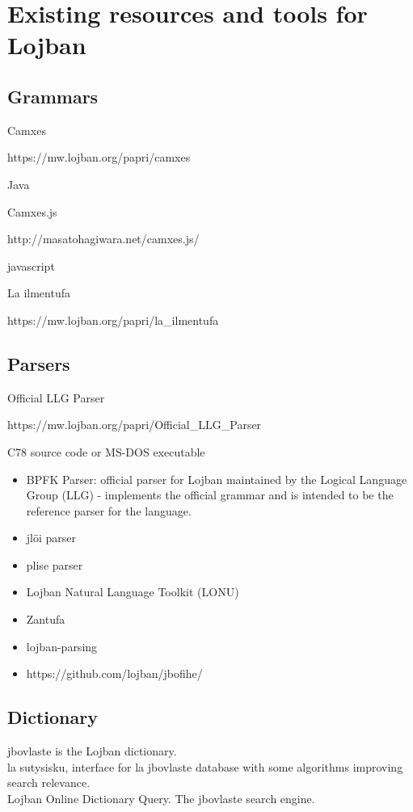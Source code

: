 \chapter{Existing resources and tools for Lojban}
\label{chap:existing-resources-and-tools}

\vspace{0.5cm}

\section*{Grammars}
\label{section:lojban-grammars}

Camxes

https://mw.lojban.org/papri/camxes

Java

Camxes.js

http://masatohagiwara.net/camxes.js/

javascript

La ilmentufa

https://mw.lojban.org/papri/la\_ilmentufa


\section*{Parsers}

Official LLG Parser

https://mw.lojban.org/papri/Official\_LLG\_Parser

C78 source code
or
MS-DOS executable

\begin{itemize}
    \item BPFK Parser: official parser for Lojban maintained by the Logical Language Group (LLG) - implements the official grammar and is intended to be the reference parser for the language.
    \item jlöi parser
    \item plise parser
    \item Lojban Natural Language Toolkit (LONU)
    \item Zantufa
    \item lojban-parsing
    \item https://github.com/lojban/jbofihe/
\end{itemize}

\section*{Dictionary}
\label{sec:dictionary}

jbovlaste is the Lojban dictionary. \\

la sutysisku, interface for la jbovlaste database with some algorithms improving search relevance. \\

Lojban Online Dictionary Query. The jbovlaste search engine.\\